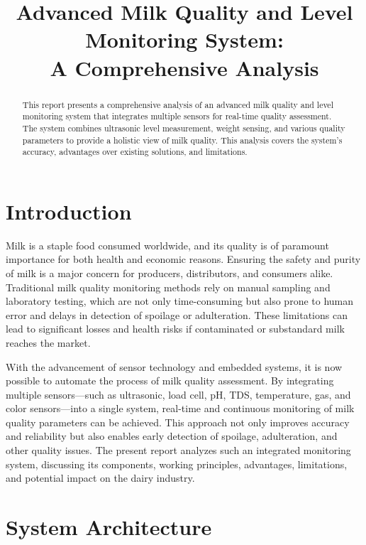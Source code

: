 \documentclass[12pt,a4paper]{article}
\title{Advanced Milk Quality and Level Monitoring System:\\
A Comprehensive Analysis}
\begin{document}
\maketitle

\begin{abstract}
This report presents a comprehensive analysis of an advanced milk quality and level monitoring system that integrates multiple sensors for real-time quality assessment. The system combines ultrasonic level measurement, weight sensing, and various quality parameters to provide a holistic view of milk quality. This analysis covers the system's accuracy, advantages over existing solutions, and limitations.
\end{abstract}

\section{Introduction}
Milk is a staple food consumed worldwide, and its quality is of paramount importance for both health and economic reasons. Ensuring the safety and purity of milk is a major concern for producers, distributors, and consumers alike. Traditional milk quality monitoring methods rely on manual sampling and laboratory testing, which are not only time-consuming but also prone to human error and delays in detection of spoilage or adulteration. These limitations can lead to significant losses and health risks if contaminated or substandard milk reaches the market.

With the advancement of sensor technology and embedded systems, it is now possible to automate the process of milk quality assessment. By integrating multiple sensors—such as ultrasonic, load cell, pH, TDS, temperature, gas, and color sensors—into a single system, real-time and continuous monitoring of milk quality parameters can be achieved. This approach not only improves accuracy and reliability but also enables early detection of spoilage, adulteration, and other quality issues. The present report analyzes such an integrated monitoring system, discussing its components, working principles, advantages, limitations, and potential impact on the dairy industry.

\section{System Architecture}
\end{document}
